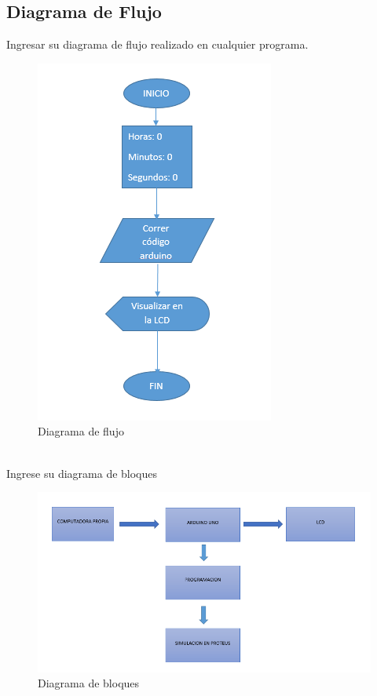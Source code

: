 \documentclass[10pt,a4paper]{article}
\begin{document}
\subsection{Diagrama de Flujo}
Ingresar su diagrama de flujo realizado en cualquier programa.
\begin{figure}[ht!]
\caption{Diagrama de flujo} %
\centering
\includegraphics[scale=0.6]{DIAGRAMA DE FLUJO.png} %
\end{figure}\\ %
Ingrese su diagrama de bloques
\begin{figure}[hbt!]
\caption{Diagrama de bloques} %
\centering
\includegraphics[scale=0.5]{DIAGRAMA DE BLOQUES.png}
\end{figure}
\end{document}
